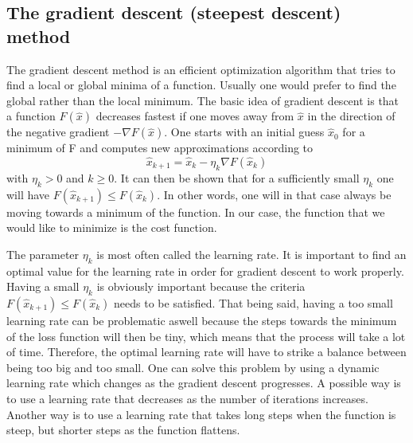 \documentclass[a4paper,12pt]{article}
\begin{document}
\subsection{The gradient descent (steepest descent) method}
The gradient descent method is an efficient optimization algorithm that tries to find a local or global minima of a function. Usually one would prefer to find the global rather than the local minimum. The basic idea of gradient descent is that a function $F(\hat{x})$ decreases fastest if one moves away from $\hat{x}$ in the direction of the negative gradient $-\nabla F(\hat{x})$.\newline
One starts with an initial guess $\hat{x}_0$ for a minimum of F and computes new approximations according to
\begin{equation}
    \hat{x}_{k+1} = \hat{x}_k - \eta_k \nabla F(\hat{x}_k)
\end{equation}
with $\eta_k > 0$ and $k \geq 0$. It can then be shown that for a sufficiently small $\eta_k$ one will have $F(\hat{x}_{k+1}) \leq F(\hat{x}_k)$. In other words, one will in that case always be moving towards a minimum of the function.\newline
In our case, the function that we would like to minimize is the cost function.\newline

The parameter $\eta_k$ is most often called the learning rate. It is important to find an optimal value for the learning rate in order for gradient descent to work properly. Having a small $\eta_k$ is obviously important because the criteria $F(\hat{x}_{k+1}) \leq F(\hat{x}_k)$ needs to be satisfied. That being said, having a too small learning rate can be problematic aswell because the steps towards the minimum of the loss function will then be tiny, which means that the process will take a lot of time. Therefore, the optimal learning rate will have to strike a balance between being too big and too small.\newline
One can solve this problem by using a dynamic learning rate which changes as the gradient descent progresses. A possible way is to use a learning rate that decreases as the number of iterations increases. Another way is to use a learning rate that takes long steps when the function is steep, but shorter steps as the function flattens.\newline
\end{document}
